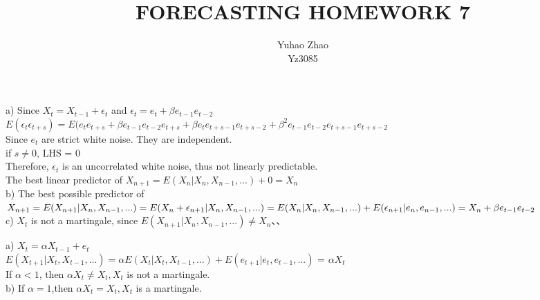 \documentclass[11pt]{article}
\newenvironment{problem}[2][Problem]{\begin{trivlist}
\item[\hskip \labelsep {\bfseries #1}\hskip \labelsep {\bfseries #2.}]}{\end{trivlist}}
\begin{document}
 
 
\title{FORECASTING HOMEWORK 7 }%
\author{Yuhao Zhao\\ %
Yz3085} %
 
\maketitle
\begin{problem}{1}
\end{problem}
a) Since $X_t = X_{t-1} + \epsilon_t $ and $\epsilon_t = e_t + \beta e_{t-1} e_{t-2}$\\
$E(\epsilon_{t}\epsilon_{t+s}) = E(e_te_{t+s} + \beta e_{t-1}e_{t-2}e_{t+s} + \beta e_{t}e_{t+s-1}e_{t+s-2} + \beta^2 e_{t-1}e_{t-2}e_{t+s-1}e_{t+s-2}$\\
Since $e_{t}$ are strict white noise. They are independent.\\
if $s \neq 0$, LHS = 0\\
Therefore, $\epsilon_{t}$ is an uncorrelated white noise, thus not linearly predictable. \\
The best linear predictor of $X_{n+1} = E(X_n| X_{n},X_{n-1},...) + 0 = X_n$\\

b) The best possible predictor of $X_{n+1} = E(X_{n+1}| X_{n},X_{n-1},...) =E(X_n+\epsilon_{n+1}|X_{n},X_{n-1},...)\\ =  E(X_n| X_{n},X_{n-1},...) + E(\epsilon_{n+1}|e_{n},e_{n-1},...) = X_n + \beta e_{t-1}e_{t-2}$\\

c) {$X_t$} is not a martingale, since $E(X_{n+1}| X_{n},X_{n-1},...) \neq X_n$、、

\begin{problem}{2}
\end{problem}
a) $X_t = \alpha X_{t-1} +e_t$\\
$E(X_{t+1}| X_{t},X_{t-1},...) = \alpha E(X_{t}| X_{t},X_{t-1},...)+E(e_{t+1}|e_t,e_{t-1},...)$
= $\alpha X_{t} $\\
If $\alpha <1 $, then $\alpha X_t \neq X_t, X_t$ is not a martingale.\\ 

b)  If $\alpha = 1 $,then $\alpha X_t = X_t, X_t$ is a martingale.\\
\end{document}
